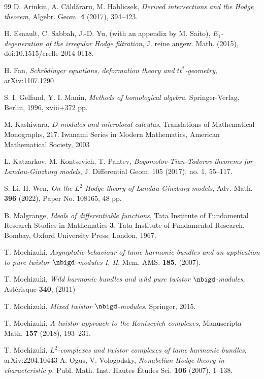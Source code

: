 \documentclass[a4,10pt]{article}
\begin{document}
\begin{thebibliography}{99}
	D. Arinkin,
	A. C\u{a}ld\u{a}raru,
	M. Hablicsek,
	{\em Derived intersections and the Hodge theorem},
	Algebr. Geom. {\bf 4} (2017), 394--423.

H. Esnault, 
C. Sabbah, 
J.-D. Yu,
(with an appendix by M. Saito),
{\em $E_1$-degeneration of the irregular Hodge filtration},
J. reine angew. Math. (2015), doi:10.1515/crelle-2014-0118.

	 H. Fan,
	 {\em Schr\"{o}dinger equations, deformation theory
	 and $tt^{\ast}$-geometry},
	 arXiv:1107.1290

S. I. Gelfand, Y. I. Manin,
{\em Methods of homological algebra},
Springer-Verlag, Berlin, 1996, xviii+372 pp.
	
M. Kashiwara,
{\em $D$-modules and microlocal calculus},
Translations of Mathematical Monographs, 217. 
Iwanami Series in Modern Mathematics,
American Mathematical Society, 
2003

L. Katzarkov, M. Kontsevich, T. Pantev,
{\em Bogomolov-Tian-Todorov theorems for Landau-Ginzburg models},
J. Differential Geom. 105 (2017), no. 1, 55--117.

	S. Li,
	H. Wen,
	{\em On the $L^2$-Hodge theory of Landau-Ginzburg models},
	Adv. Math. {\bf 396} (2022), Paper No. 108165, 48 pp.
	
B. Malgrange,
{\em Ideals of differentiable functions},
Tata Institute of Fundamental Research Studies in Mathematics
{\bf 3}, Tata Institute of Fundamental Research, Bombay,
Oxford University Press, London, 1967.	 
	
T. Mochizuki,
{\em Asymptotic behaviour of tame harmonic bundles
and an application to pure twistor $\nbigd$-modules I, II},
Mem. AMS. {\bf 185}, (2007).
	
T. Mochizuki,
{\em Wild harmonic bundles and 
 wild pure twistor $\nbigd$-modules},
Ast\'{e}risque {\bf 340}, (2011)

T. Mochizuki,
{\em Mixed twistor $\nbigd$-modules},
Springer, 2015.

	T. Mochizuki,
	{\em A twistor approach to the Kontsevich complexes},
	Manuscripta Math. {\bf 157} (2018), 193--231.

	 T. Mochizuki,
	 {\em $L^2$-complexes and twistor complexes of
	 tame harmonic bundles},
	 arXiv:2204.10443	 
	 A. Ogus, 
	 V. Vologodsky,
	 {\em Nonabelian Hodge theory in characteristic $p$.}
	 Publ. Math. Inst. Hautes \'{E}tudes Sci. {\bf 106} (2007), 1--138.
	 

\end{thebibliography}
\end{document}
